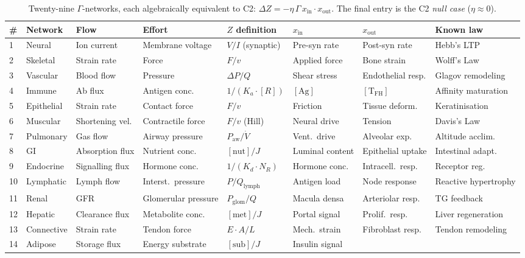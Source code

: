 \documentclass[aps,pre,twocolumn,superscriptaddress,floatfix]{revtex4-2}
\begin{document}
\begin{table}[t]
\centering
\caption{Twenty-nine $\Gamma$-networks, each algebraically
equivalent to C2:
$\Delta Z = -\eta\,\Gamma\,x_{\text{in}} \cdot x_{\text{out}}$.
The final entry is the C2 \emph{null case} ($\eta \approx 0$).}
\label{tab:twentynine}
\begin{tabular}{llllllll}
\toprule
\# & Network & Flow & Effort & $Z$ definition &
$x_{\text{in}}$ & $x_{\text{out}}$ & Known law \\
\midrule
1 & Neural & Ion current & Membrane voltage &
$V/I$ (synaptic) & Pre-syn rate & Post-syn rate &
Hebb's LTP \\
2 & Skeletal & Strain rate & Force &
$F/v$ & Applied force & Bone strain &
Wolff's Law \\
3 & Vascular & Blood flow & Pressure &
$\Delta P/Q$ & Shear stress & Endothelial resp. &
Glagov remodeling \\
4 & Immune & Ab flux & Antigen conc. &
$1/(K_a \cdot [R])$ & $[\text{Ag}]$ &
$[\text{T}_{\text{FH}}]$ & Affinity maturation \\
5 & Epithelial & Strain rate & Contact force &
$F/v$ & Friction & Tissue deform. &
Keratinisation \\
6 & Muscular & Shortening vel. & Contractile force &
$F/v$ (Hill) & Neural drive & Tension &
Davis's Law \\
7 & Pulmonary & Gas flow & Airway pressure &
$P_{\text{aw}}/\dot{V}$ & Vent.\ drive &
Alveolar exp. & Altitude acclim. \\
8 & GI & Absorption flux & Nutrient conc. &
$[\text{nut}]/J$ & Luminal content &
Epithelial uptake & Intestinal adapt. \\
9 & Endocrine & Signalling flux & Hormone conc. &
$1/(K_d \cdot N_R)$ & Hormone conc. &
Intracell.\ resp. & Receptor reg. \\
10 & Lymphatic & Lymph flow & Interst.\ pressure &
$P/Q_{\text{lymph}}$ & Antigen load &
Node response & Reactive hypertrophy \\
11 & Renal & GFR & Glomerular pressure &
$P_{\text{glom}}/Q$ & Macula densa &
Arteriolar resp. & TG feedback \\
12 & Hepatic & Clearance flux & Metabolite conc. &
$[\text{met}]/J$ & Portal signal &
Prolif.\ resp. & Liver regeneration \\
13 & Connective & Strain rate & Tendon force &
$E \cdot A/L$ & Mech.\ strain &
Fibroblast resp. & Tendon remodeling \\
14 & Adipose & Storage flux & Energy substrate &
$[\text{sub}]/J$ & Insulin signal &

\end{tabular}
\end{table}
\end{document}
